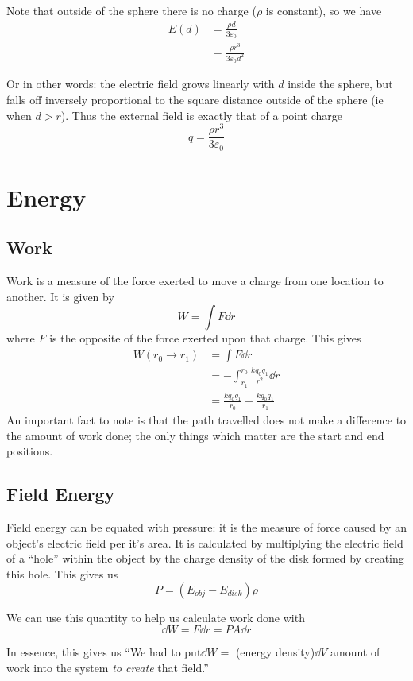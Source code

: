 \documentclass[12pt]{article}
\newcommand{\inint}[2]{\int #1 \dd #2}
\begin{document}
Note that outside of the sphere there is no charge ($\rho$ is constant), so we have
\begin{align*}
E(d) &= \frac{\rho d}{3\varepsilon_0} \\
     &= \frac{\rho r^3}{3\varepsilon_0 d^2}
\end{align*}

Or in other words: the electric field grows linearly with $d$ inside the sphere, but falls off inversely proportional to the square distance outside of the sphere (ie when $d > r$). Thus the external field is exactly that of a point charge \[ q = \frac{\rho r^3}{3\varepsilon_0} \]

\section*{Energy}
\subsection*{Work}
Work is a measure of the force exerted to move a charge from one location to another. It is given by \[ W = \inint{F}{r} \] where $F$ is the opposite of the force exerted upon that charge. This gives
\begin{align*}
W(r_0 \to r_1) &= \inint{F}{r}\\
               &= -\int_{r_1}^{r_0} \frac{kq_0q_1}{r^2} \dd r\\
               &= \frac{kq_0q_1}{r_0} - \frac{kq_0q_1}{r_1}
\end{align*}
An important fact to note is that the path travelled does not make a difference to the amount of work done; the only things which matter are the start and end positions.

\subsection*{Field Energy}
Field energy can be equated with pressure: it is the measure of force caused by an object's electric field per it's area. It is calculated by multiplying the electric field of a ``hole'' within the object by the charge density of the disk formed by creating this hole. This gives us \[ P = (E_{obj} - E_{disk})\rho \]

We can use this quantity to help us calculate work done with \[ \dd W = F \dd r = PA \dd r \]

In essence, this gives us ``We had to put$\dd W = $ (energy density)$\dd V$ amount of work into the system \emph{to create} that field.''
\end{document}
